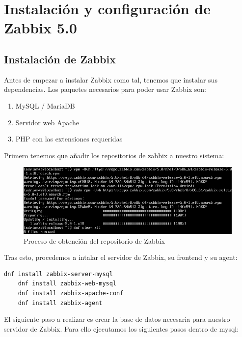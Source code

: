 \newpage
\section{Instalación y configuración de Zabbix 5.0}
\subsection{Instalación de Zabbix}

Antes de empezar a instalar Zabbix como tal, tenemos que instalar sus dependencias. Los paquetes necesarios para poder usar Zabbix son:

\begin{enumerate}
	\item MySQL / MariaDB
	\item Servidor web Apache
	\item PHP con las extensiones requeridas
\end{enumerate}

Primero tenemos que añadir los repositorios de zabbix a nuestro sistema:

\begin{figure}[H]
	\centering
	\includegraphics[scale=0.5]{graphics/img3}
	\caption{Proceso de obtención del repositorio de Zabbix}
\end{figure}

Tras esto, procedemos a intalar el servidor de Zabbix, su frontend y su agent:

\begin{lstlisting}[language=bash]
	dnf install zabbix-server-mysql
	dnf install zabbix-web-mysql
	dnf install zabbix-apache-conf
	dnf install zabbix-agent
\end{lstlisting}

El siguiente paso a realizar es crear la base de datos necesaria para nuestro servidor de Zabbix. Para ello ejecutamos los siguientes pasos dentro de mysql:

